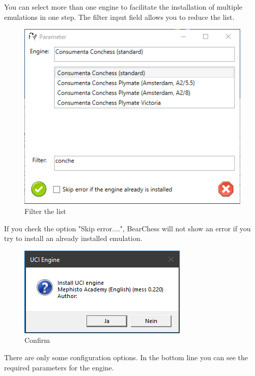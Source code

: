 \documentclass[11pt,a4paper]{article}
\begin{document}
You can select more than one engine to facilitate the installation of multiple emulations in one step. The filter input field allows you to reduce the list.

\begin{figure}[H]
	\centering
	\includegraphics[scale=0.8]{MessChess5.png}
	\caption{Filter the list}
	\label{fig:MessChess5}
\end{figure}

If you check the option "Skip error....", BearChess will not show an error if you try to install an already installed emulation.

\begin{figure}[H]
	\centering
	\includegraphics[scale=0.9]{MessChess2.png}
	\caption{Confirm}
	\label{fig:MessChess2}
\end{figure}

There are only some configuration options. In the bottom line you can see the required parameters for the engine.
\end{document}
